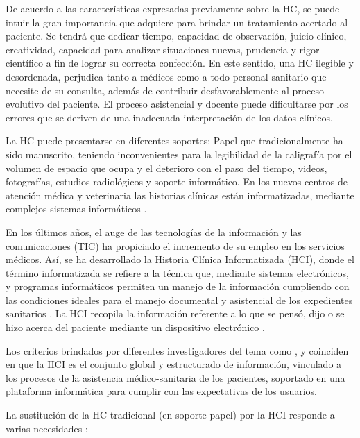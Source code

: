 De acuerdo a las características expresadas previamente sobre la HC, se puede intuir la gran importancia que adquiere para brindar un tratamiento acertado al paciente. Se tendrá que dedicar tiempo, capacidad de observación, juicio clínico, creatividad, capacidad para analizar situaciones nuevas, prudencia y rigor científico a fin de lograr su correcta confección. En este sentido, una HC ilegible y desordenada, perjudica tanto a médicos como a todo personal sanitario que necesite de su consulta, además de contribuir desfavorablemente al proceso evolutivo del paciente. El proceso asistencial y docente puede dificultarse por los errores que se deriven de una inadecuada interpretación de los datos clínicos.  

La HC puede presentarse en diferentes soportes: Papel que tradicionalmente ha sido manuscrito, teniendo inconvenientes para la legibilidad de la caligrafía por el volumen de espacio que ocupa y el deterioro con el paso del tiempo, videos, fotografías, estudios radiológicos y soporte informático. En los nuevos centros de atención médica y veterinaria las historias clínicas están informatizadas, mediante complejos sistemas informáticos .

En los últimos años, el auge de las tecnologías de la información y las comunicaciones (TIC) ha propiciado el incremento de su empleo en los servicios médicos. Así, se ha desarrollado la Historia Clínica Informatizada (HCI), donde el término informatizada se refiere a la técnica que, mediante sistemas electrónicos, y programas informáticos permiten un manejo de la información cumpliendo con las condiciones ideales para el manejo documental y asistencial de los expedientes sanitarios  . La HCI recopila la información referente a lo que se pensó, dijo o se hizo acerca del paciente mediante un dispositivo electrónico  .

Los criterios brindados por diferentes investigadores del tema como   ,   y  coinciden en que la HCI es el conjunto global y estructurado de información, vinculado a los procesos de la asistencia médico-sanitaria de los pacientes, soportado en una plataforma informática para cumplir con las expectativas de los usuarios. 

La sustitución de la HC tradicional (en soporte papel) por la HCI responde a varias necesidades :  

